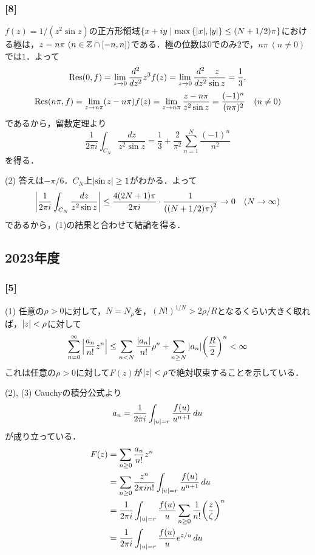 \documentclass[a4j]{ltjsarticle}
\newcommand{\Zset}{\mathbb{Z}}
\newcommand{\1}{\mathbbm{1}}
\numberwithin{equation}{section}
\theoremstyle{definition}
\begin{document}
\subsubsection*{[8]}
$f(z)=1/(z^2\sin z)$の正方形領域$\qty{x+iy\mid \max\qty{\abs{x},\abs{y}}\leq (N+1/2)\pi}$における極は，$z=n\pi\ (n\in \Zset\cap\qty[-n,n])$である．極の位数は$0$でのみ$2$で，$n\pi\ (n\neq0)$では$1$．よって
\begin{equation}
    \Residue(0,f)=\lim_{z\to0}\frac{d^2}{dz^2}z^3f(z)=\lim_{z\to0}\frac{d^2}{dz^2}\frac{z}{\sin z}=\frac{1}{3},
\end{equation}
\begin{equation}
    \Res(n\pi,f)=\lim_{z\to n\pi}(z-n\pi)f(z)=\lim_{z\to n\pi}\frac{z-n\pi}{z^2\sin z}=\frac{(-1)^n}{(n\pi)^2}\quad (n\neq0)
\end{equation}
であるから，留数定理より
\begin{equation}
    \frac{1}{2\pi i}\int_{C_N}\frac{dz}{z^2\sin z}=\frac{1}{3}+\frac{2}{\pi^2}\sum_{n=1}^N\frac{(-1)^n}{n^2}
\end{equation}
を得る．

(2) 答えは$-\pi/6$．$C_N$上$\abs{\sin z}\geq 1$がわかる．よって
\begin{equation}
    \abs{\frac{1}{2\pi i}\int_{C_N}\frac{dz}{z^2\sin z}}\leq \frac{4(2N+1)\pi}{2\pi i}\cdot \frac{1}{\qty(\qty(N+1/2)\pi)^2}\to0\quad (N\to\infty)
\end{equation}
であるから，(1)の結果と合わせて結論を得る．
\subsection{2023年度}
\subsubsection*{[5]}
(1) 任意の$\rho>0$に対して，$N=N_{\rho}$を，$(N!)^{1/N}>2\rho/R$となるくらい大きく取れば，$\abs{z}<\rho$に対して
\begin{equation}
    \sum_{n=0}^\infty \abs{\frac{a_n}{n!}z^n}\leq \sum_{n< N}\frac{\abs{a_n}}{n!}\rho^n+\sum_{n\geq N}\abs{a_n}\qty(\frac{R}{2})^n<\infty 
\end{equation}
これは任意の$\rho>0$に対して$F(z)$が$\abs{z}<\rho$で絶対収束することを示している．

(2), (3) Cauchyの積分公式より
\begin{equation}
    a_n=\frac{1}{2\pi i}\int_{\abs{u}=r}\frac{f(u)}{u^{n+1}}\,du 
\end{equation}
が成り立っている．
\begin{align}
    F(z)&=\sum_{n\geq0}\frac{a_n}{n!}z^n\\
    &=\sum_{n\geq0}\frac{z^n}{2\pi i n!}\int_{\abs{u}=r}\frac{f(u)}{u^{n+1}}\,du\\
    &=\frac{1}{2\pi i}\int_{\abs{u}=r}\frac{f(u)}{u}\sum_{n\geq0}\frac{1}{n!}\qty(\frac{z}{\zeta})^n\\
    &=\frac{1}{2\pi i}\int_{\abs{u}=r}\frac{f(u)}{u}e^{z/u}\,du 
\end{align}
\end{document}
